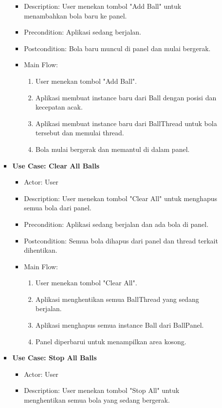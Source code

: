 \documentclass[a4paper]{article}
\begin{document}
\begin{enumerate}[itemsep=1em]
\begin{enumerate}[itemsep=1em]
\begin{itemize}
\begin{itemize}
        \item Description: User menekan tombol "Add Ball" untuk menambahkan bola baru ke panel.
        \item Precondition: Aplikasi sedang berjalan.
        \item Postcondition: Bola baru muncul di panel dan mulai bergerak.
        \item Main Flow:
        \begin{enumerate}
          \item User menekan tombol "Add Ball".
          \item Aplikasi membuat instance baru dari Ball dengan posisi dan kecepatan acak.
          \item Aplikasi membuat instance baru dari BallThread untuk bola tersebut dan memulai thread.
          \item Bola mulai bergerak dan memantul di dalam panel.
        \end{enumerate}
      \end{itemize}
      \item \textbf{Use Case: Clear All Balls}
      \begin{itemize}
        \item Actor: User
        \item Description: User menekan tombol "Clear All" untuk menghapus semua bola dari panel.
        \item Precondition: Aplikasi sedang berjalan dan ada bola di panel.
        \item Postcondition: Semua bola dihapus dari panel dan thread terkait dihentikan.
        \item Main Flow:
        \begin{enumerate}
          \item User menekan tombol "Clear All".
          \item Aplikasi menghentikan semua BallThread yang sedang berjalan.
          \item Aplikasi menghapus semua instance Ball dari BallPanel.
          \item Panel diperbarui untuk menampilkan area kosong.
        \end{enumerate}
      \end{itemize}
      \item \textbf{Use Case: Stop All Balls}
      \begin{itemize}
        \item Actor: User
        \item Description: User menekan tombol "Stop All" untuk menghentikan semua bola yang sedang bergerak.

\end{itemize}
\end{itemize}
\end{enumerate}
\end{enumerate}
\end{document}
